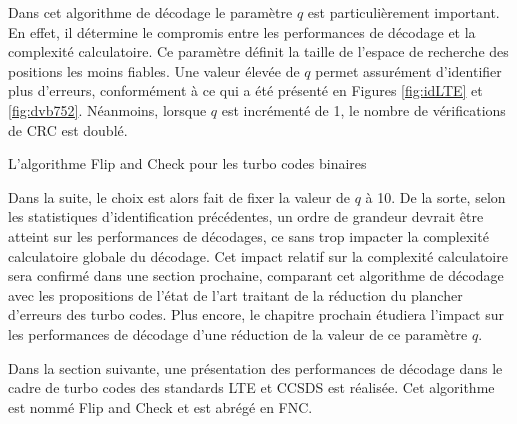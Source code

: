 Dans cet algorithme de décodage le paramètre $q$ est particulièrement important. En effet, il détermine le compromis entre les performances
de décodage et la complexité calculatoire. Ce paramètre définit la taille de l'espace de recherche des positions les moins
fiables. Une valeur élevée de $q$ permet assurément d'identifier plus d'erreurs, conformément à ce qui a été
présenté en Figures \ref{fig:idLTE} et \ref{fig:dvb752}. Néanmoins, lorsque $q$ est incrémenté de 1, le nombre de 
vérifications de CRC est doublé.
\begin{center}
\begin{minipage}{.86\textwidth}%
\begin{algorithm}[H]
\label{alg:fc_b}
	\DontPrintSemicolon
	
	\;
	\caption{L'algorithme Flip and Check pour les turbo codes binaires}
\end{algorithm}
\end{minipage}
\end{center}
Dans la suite, le choix est alors fait de fixer la valeur de $q$ à 10. De la sorte, selon les statistiques d'identification 
précédentes, un ordre de grandeur devrait être atteint sur les performances de décodages, ce sans trop impacter la complexité
calculatoire globale du décodage. Cet impact relatif sur la complexité calculatoire sera confirmé dans une section prochaine,
comparant cet algorithme de décodage avec les propositions de l'état de l'art traitant de la réduction du plancher d'erreurs des turbo codes.
Plus encore, le chapitre prochain étudiera l'impact sur les performances de décodage d'une réduction de la valeur de ce paramètre $q$.

Dans la section suivante, une présentation des performances de décodage dans le cadre de turbo codes des standards LTE
et CCSDS est réalisée. Cet algorithme est nommé Flip and Check et est abrégé en FNC.


